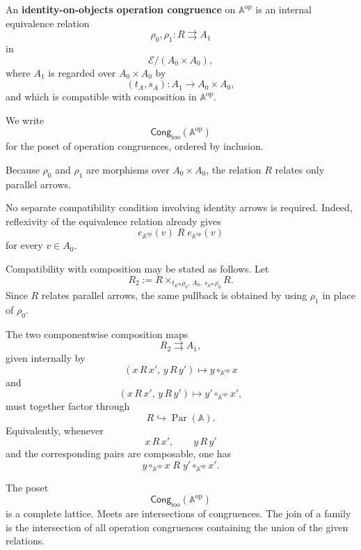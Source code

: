\begin{definition}
\label{def:to-operation-congruence}
    An \textbf{identity-on-objects operation congruence} on
    \(\mathbb A^{\mathrm{op}}\) is an internal equivalence relation
    \[
        \rho_0,\rho_1:
        R\rightrightarrows A_1
    \]
    in
    \[
        \mathcal E/(A_0\times A_0),
    \]
    where \(A_1\) is regarded over \(A_0\times A_0\) by
    \[
        (t_A,s_A):A_1\to A_0\times A_0,
    \]
    and which is compatible with composition in
    \(\mathbb A^{\mathrm{op}}\).

    We write
    \[
        \mathsf{Cong}_{\mathrm{ioo}}
        (\mathbb A^{\mathrm{op}})
    \]
    for the poset of operation congruences, ordered by inclusion.
\end{definition}

Because \(\rho_0\) and \(\rho_1\) are morphisms over
\(A_0\times A_0\), the relation \(R\) relates only parallel arrows.

No separate compatibility condition involving identity arrows is required.
Indeed, reflexivity of the equivalence relation already gives
\[
    e_{\mathbb A^{\mathrm{op}}}(v)
    \;R\;
    e_{\mathbb A^{\mathrm{op}}}(v)
\]
for every \(v\in A_0\).

Compatibility with composition may be stated as follows. Let
\[
    R_2
    :=
    R
    \times_{
        t_{\mathbb A^{\mathrm{op}}}\rho_0,\,
        A_0,\,
        s_{\mathbb A^{\mathrm{op}}}\rho_0
    }
    R.
\]
Since \(R\) relates parallel arrows, the same pullback is obtained by using
\(\rho_1\) in place of \(\rho_0\).

The two componentwise composition maps
\[
    R_2
    \rightrightarrows
    A_1,
\]
given internally by
\[
    (x\,R\,x',\,y\,R\,y')
    \longmapsto
    y\circ_{\mathbb A^{\mathrm{op}}}x
\]
and
\[
    (x\,R\,x',\,y\,R\,y')
    \longmapsto
    y'\circ_{\mathbb A^{\mathrm{op}}}x',
\]
must together factor through
\[
    R\hookrightarrow\operatorname{Par}(\mathbb A).
\]
Equivalently, whenever
\[
    x\,R\,x',
    \qquad
    y\,R\,y'
\]
and the corresponding pairs are composable, one has
\[
    y\circ_{\mathbb A^{\mathrm{op}}}x
    \;R\;
    y'\circ_{\mathbb A^{\mathrm{op}}}x'.
\]

The poset
\[
    \mathsf{Cong}_{\mathrm{ioo}}
    (\mathbb A^{\mathrm{op}})
\]
is a complete lattice. Meets are intersections of congruences. The join of a
family is the intersection of all operation congruences containing the union
of the given relations.

